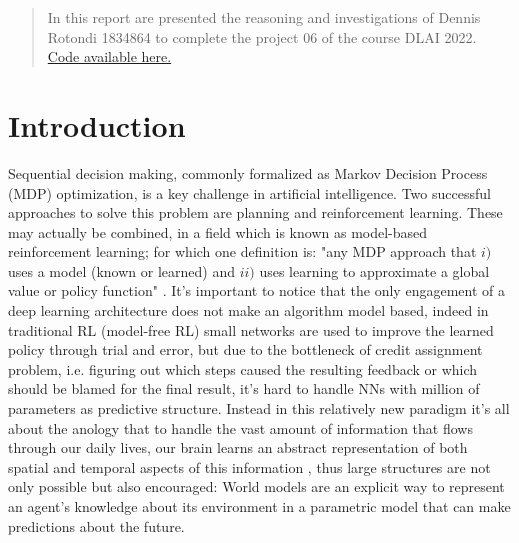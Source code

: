\documentclass{article}
\begin{document}

\printAffiliationsAndNotice{}

\begin{abstract}
%
In this report are presented the reasoning and investigations of Dennis Rotondi 1834864 to complete the project 06 of the course DLAI 2022.
\href{https://github.com/DennisRotondi/dlai_project}{Code available here.}

\end{abstract}

\section{Introduction}
Sequential decision making, commonly formalized as Markov Decision Process (MDP) optimization, is a key challenge in artificial intelligence. Two successful approaches to solve this problem are planning
and reinforcement learning. These may actually
be combined, in a field which is known as model-based reinforcement learning; for which one definition is: "any MDP approach that $i)$ uses a model (known or learned) and $ii)$
uses learning to approximate a global value or policy function" \cite{mb_survey}.
It's important to notice that the only engagement of a deep learning architecture does not make an algorithm model based, indeed in 
traditional RL (model-free RL) small networks are used to improve the learned policy through trial and error, but due to the bottleneck of credit assignment problem, i.e. figuring out which steps caused the resulting feedback or which should be blamed for the final result, it's hard to handle
NNs with million of parameters as predictive structure. Instead in this relatively new paradigm it's all about the anology that to handle the vast amount of information that flows through our daily lives, our brain learns an abstract representation of both spatial and temporal aspects of this information \cite{brain_article}, thus large structures are not only possible but also encouraged:  World models are an explicit
way to represent an agent's knowledge about its environment in a parametric model that can make predictions about the future.
\end{document}
